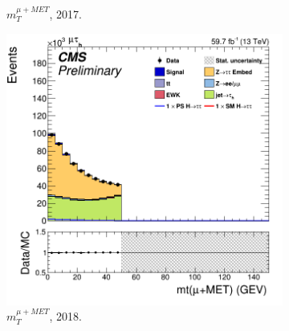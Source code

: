 \begin{figure}
\begin{subfigure}[b]{0.33\linewidth}
    \caption{$m^{\mu+MET}_T$, 2017.} 
    \vspace{0.5ex}
  \end{subfigure} 
    \begin{subfigure}[b]{0.33\linewidth}
    \centering
    \includegraphics[width=\linewidth]{Chapitre7/Images/CtrlPlots/2018/MuMETmt.png} 
    \caption{$m^{\mu+MET}_T$, 2018.} 
    \vspace{0.5ex}
  \end{subfigure} 
  \caption{}
  \label{page4}
\end{figure}